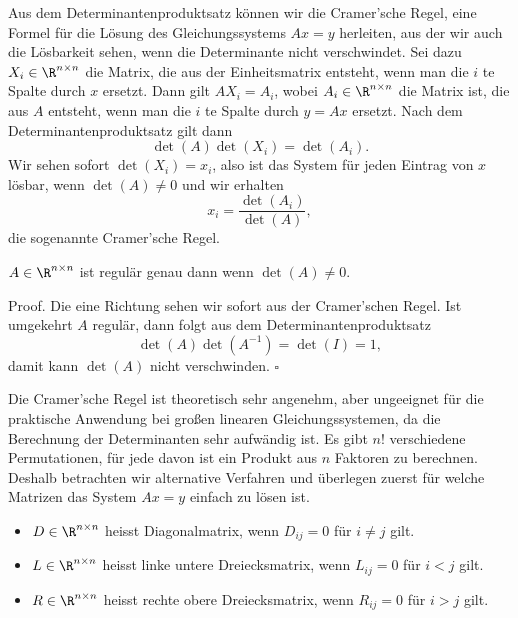 Aus dem Determinantenproduktsatz können wir die Cramer’sche Regel, eine Formel für die Lösung des Gleichungssystems \(Ax=y\) herleiten, aus der wir auch die Lösbarkeit sehen, wenn die Determinante nicht verschwindet. Sei dazu \(X_i \in \R^{n \times n}\) die Matrix, die aus der Einheitsmatrix entsteht, wenn man die \(i\) te Spalte durch \(x\) ersetzt. Dann gilt \(A X_i = A_i\), wobei \(A_i \in \R^{n \times n}\) die Matrix ist, die aus \(A\) entsteht, wenn man die \(i\) te Spalte durch \(y=Ax\) ersetzt.  Nach dem Determinantenproduktsatz gilt dann
\begin{equation*}
 \det(A) \det(X_i) = \det(A_i).
\end{equation*}
Wir sehen sofort \(\det(X_i)=x_i\), also ist das System für jeden Eintrag von \(x\) lösbar, wenn \(\det(A)\neq 0\) und wir erhalten
\begin{equation*}
 x_i = \frac{\det(A_i)}{\det(A)},
\end{equation*}
die sogenannte Cramer’sche Regel.
\label{vektorraeume/LGS:theorem-18}
\begin{theorem}{}{}



\(A \in \R^{n \times n}\) ist regulär genau dann wenn \(\det(A)\neq 0\).
\end{theorem}

\begin{emphBox}{}{}
Proof. Die eine Richtung sehen wir sofort aus der Cramer’schen Regel. Ist umgekehrt \(A\) regulär, dann folgt aus dem Determinantenproduktsatz
\begin{equation*}
 \det(A) \det(A^{-1}) = \det(I) = 1,
\end{equation*}
damit kann \(\det(A)\) nicht verschwinden. \(\square\)
\end{emphBox}

Die Cramer’sche Regel ist theoretisch sehr angenehm, aber ungeeignet für die praktische Anwendung bei großen linearen Gleichungssystemen, da die Berechnung der Determinanten sehr aufwändig ist. Es gibt \(n!\) verschiedene Permutationen, für jede davon ist ein Produkt aus \(n \) Faktoren zu berechnen. Deshalb betrachten wir alternative Verfahren und überlegen zuerst für welche Matrizen das System \(Ax=y\) einfach zu lösen ist.
\label{vektorraeume/LGS:definition-19}
\begin{definition}{}{}


\begin{itemize}
\item {} 
\(D \in \R^{n \times n}\) heisst Diagonalmatrix, wenn \(D_{ij} =0 \) für \(i \neq j\) gilt.

\item {} 
\(L \in \R^{n \times n}\) heisst linke untere Dreiecksmatrix, wenn \(L_{ij} =0 \) für \(i < j\) gilt.

\item {} 
\(R \in \R^{n \times n}\) heisst rechte obere Dreiecksmatrix, wenn \(R_{ij} =0 \) für \(i > j\) gilt.

\end{itemize}
\end{definition}

